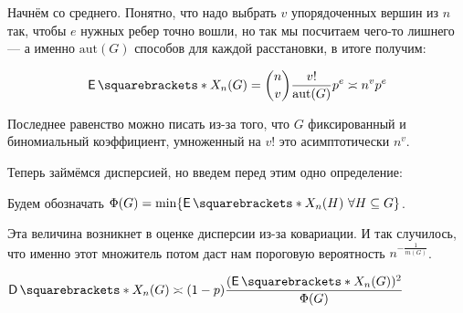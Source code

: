 Начнём со среднего. Понятно, что надо выбрать $v$ упорядоченных вершин из $n$ так, чтобы $e$
нужных ребер точно вошли, но так мы посчитаем чего-то лишнего --- а именно 
$\mathrm{aut}(G)$ способов для каждой расстановки, в итоге получим:

\[
  \E{X_n(G)} = \binom{n}{v}\frac{v!}{\mathrm{aut}(G)}p^e \asymp n^vp^e
\]

Последнее равенство можно писать из-за того, что $G$ фиксированный и биномиальный
коэффициент, умноженный на $v!$
это асимптотически $n^v$.

Теперь займёмся дисперсией, но введем перед этим одно определение:

\begin{definition}
  Будем обозначать $\Phi(G) = \min\{\E{X_n(H)} \ \forall H \subseteq G\}$.
\end{definition}

Эта величина возникнет в оценке дисперсии из-за ковариации. И так случилось, что
именно этот множитель потом даст нам пороговую вероятность $n^{-\frac{1}{m(G)}}$.

\begin{lemma}
  $\D{X_n(G)} \asymp (1 - p)\dfrac{(\E{X_n(G)})^2}{\Phi(G)}$
\end{lemma}

